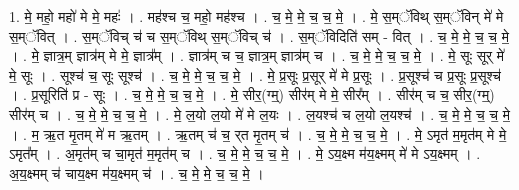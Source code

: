 \documentclass[17pt]{extarticle}
\begin{document}
1. मे॒ महो॒ महो॑ मे मे॒ महः॑ । . मह॑श्च च॒ महो॒ मह॑श्च । . च॒ मे॒ मे॒ च॒ च॒ मे॒ । . मे॒ स॒म्ॅविथ् स॒म्ॅविन् मे॑ मे स॒म्ॅवित् । . स॒म्ॅविच् च॑ च स॒म्ॅविथ् स॒म्ॅविच् च॑ । . स॒म्ॅविदिति॑ सम् - वित् । . च॒ मे॒ मे॒ च॒ च॒ मे॒ । . मे॒ ज्ञात्र॒म् ज्ञात्र॑म् मे मे॒ ज्ञात्र᳚म् । . ज्ञात्र॑म् च च॒ ज्ञात्र॒म् ज्ञात्र॑म् च । . च॒ मे॒ मे॒ च॒ च॒ मे॒ । . मे॒ सूः सूर् मे॑ मे॒ सूः । . सूश्च॑ च॒ सूः सूश्च॑ । . च॒ मे॒ मे॒ च॒ च॒ मे॒ । . मे॒ प्र॒सूः प्र॒सूर् मे॑ मे प्र॒सूः । . प्र॒सूश्च॑ च प्र॒सूः प्र॒सूश्च॑ । . प्र॒सूरिति॑ प्र - सूः । . च॒ मे॒ मे॒ च॒ च॒ मे॒ । . मे॒ सीर॒(ग्म्॒) सीर॑म् मे मे॒ सीर᳚म् । . सीर॑म् च च॒ सीर॒(ग्म्॒) सीर॑म् च । . च॒ मे॒ मे॒ च॒ च॒ मे॒ । . मे॒ ल॒यो ल॒यो मे॑ मे ल॒यः । . ल॒यश्च॑ च ल॒यो ल॒यश्च॑ । . च॒ मे॒ मे॒ च॒ च॒ मे॒ । . म॒ ऋ॒त मृ॒तम् मे॑ म ऋ॒तम् । . ऋ॒तम् च॑ च॒ र्‌त मृ॒तम् च॑ । . च॒ मे॒ मे॒ च॒ च॒ मे॒ । . मे॒ ऽमृत॑ म॒मृत॑म् मे मे॒ ऽमृत᳚म् । . अ॒मृत॑म् च चा॒मृत॑ म॒मृत॑म् च । . च॒ मे॒ मे॒ च॒ च॒ मे॒ । . मे॒ ऽय॒क्ष्म म॑य॒क्ष्मम् मे॑ मे ऽय॒क्ष्मम् । . अ॒य॒क्ष्मम् च॑ चाय॒क्ष्म म॑य॒क्ष्मम् च॑ । . च॒ मे॒ मे॒ च॒ च॒ मे॒ । \newline
\end{document}
